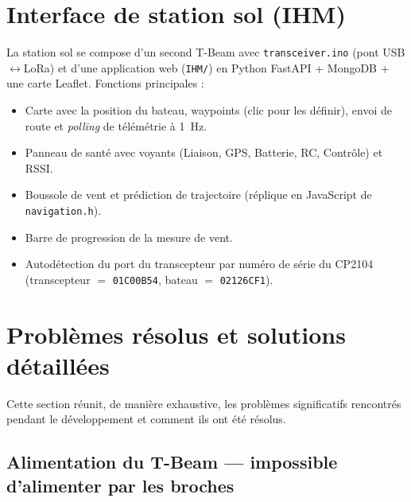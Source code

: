 \documentclass[12pt,a4paper]{article}
\newcommand{\file}[1]{\texttt{#1}}
\begin{document}
\section{Interface de station sol (IHM)}

La station sol se compose d'un second T-Beam avec \file{transceiver.ino}
(pont USB$\leftrightarrow$LoRa) et d'une application web (\file{IHM/}) en Python
FastAPI + MongoDB + une carte Leaflet. Fonctions principales :

\begin{itemize}
  \item Carte avec la position du bateau, waypoints (clic pour les d\'efinir), envoi
    de route et \emph{polling} de t\'el\'em\'etrie à 1~Hz.
  \item Panneau de sant\'e avec voyants (Liaison, GPS, Batterie, RC, Contr\^ole) et RSSI.
  \item Boussole de vent et pr\'ediction de trajectoire (r\'eplique en JavaScript de
    \file{navigation.h}).
  \item Barre de progression de la mesure de vent.
  \item Autod\'etection du port du transcepteur par num\'ero de s\'erie du CP2104
    (transcepteur $=$ \texttt{01C00B54}, bateau $=$ \texttt{02126CF1}).
\end{itemize}

\section{Probl\`emes r\'esolus et solutions d\'etaill\'ees}

Cette section r\'eunit, de mani\`ere exhaustive, les probl\`emes significatifs
rencontr\'es pendant le d\'eveloppement et comment ils ont \'et\'e r\'esolus.

\subsection{Alimentation du T-Beam --- impossible d'alimenter par les broches}
\label{sec:alim}
\end{document}
